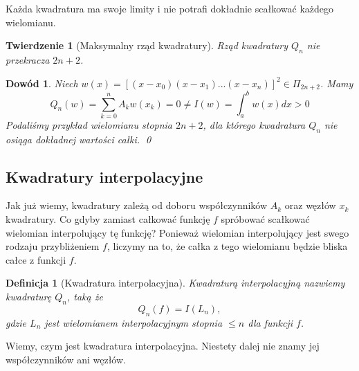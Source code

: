 \documentclass{article}
\newtheorem{defi}{Definicja}
\newtheorem{twr}{Twierdzenie}
\newtheorem*{dd}{Dowód}
\begin{document}
Każda kwadratura ma swoje limity i nie potrafi dokładnie scałkować każdego wielomianu.
\begin{twr}[Maksymalny rząd kwadratury]
	Rząd kwadratury $Q_n$ nie przekracza $2n + 2$.
\end{twr}
\begin{dd}
	\normalfont
	Niech $w(x) = [(x - x_0)(x - x_1) ... (x - x_n)]^2 \in \Pi_{2n + 2}$. Mamy
	\begin{equation*}
		Q_n(w) = \sum_{k = 0}^n A_k w(x_k) = 0 \neq I(w) = \int_a^b w(x) dx > 0
	\end{equation*}
	Podaliśmy przykład wielomianu stopnia $2n + 2$, dla którego kwadratura $Q_n$ nie osiąga dokładnej wartości całki.
	\qed
\end{dd}


\subsection{Kwadratury interpolacyjne}
Jak już wiemy, kwadratury zależą od doboru współczynników ${A_k}$ oraz węzłów ${x_k}$ kwadratury.
Co gdyby zamiast całkować funkcję $f$ spróbować scałkować wielomian interpolujący tę funkcję?
Ponieważ wielomian interpolujący jest swego rodzaju przybliżeniem $f$, liczymy na to, że całka z tego wielomianu będzie bliska całce z funkcji $f$.
\begin{defi}[Kwadratura interpolacyjna]
	Kwadraturą interpolacyjną nazwiemy kwadraturę $Q_n$, taką że
	\begin{equation*}
		Q_n(f) = I(L_n),
	\end{equation*}
	gdzie $L_n$ jest wielomianem interpolacyjnym stopnia $\leq n$ dla funkcji $f$.
\end{defi}
Wiemy, czym jest kwadratura interpolacyjna. Niestety dalej nie znamy jej współczynników ani węzłów.
\end{document}
